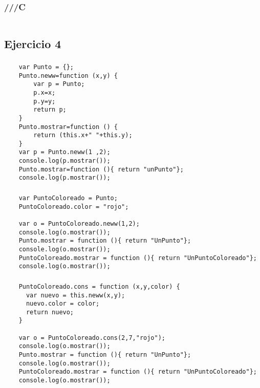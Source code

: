 \documentclass[10pt,a4paper]{article}
\begin{document}
\subsubsection{///C}
    \begin{lstlisting}
    \end{lstlisting}
\subsection{Ejercicio 4}
\subsubsection{}
    \begin{lstlisting}
    var Punto = {};
    Punto.neww=function (x,y) {
    	var p = Punto;
    	p.x=x;
    	p.y=y;
    	return p;
    }
    Punto.mostrar=function () {
    	return (this.x+" "+this.y);
    }
    var p = Punto.neww(1 ,2);
    console.log(p.mostrar());
    Punto.mostrar=function (){ return "unPunto"};
    console.log(p.mostrar());
    \end{lstlisting}

\subsubsection{}
    \begin{lstlisting}
    var PuntoColoreado = Punto;
    PuntoColoreado.color = "rojo";
    
    var o = PuntoColoreado.neww(1,2);
    console.log(o.mostrar());
    Punto.mostrar = function (){ return "UnPunto"};
    console.log(o.mostrar());
    PuntoColoreado.mostrar = function (){ return "UnPuntoColoreado"};
    console.log(o.mostrar());
    \end{lstlisting}
\subsubsection{}
    \begin{lstlisting}
    PuntoColoreado.cons = function (x,y,color) {
      var nuevo = this.neww(x,y);
      nuevo.color = color;
      return nuevo;
    }

    var o = PuntoColoreado.cons(2,7,"rojo");
    console.log(o.mostrar());
    Punto.mostrar = function (){ return "UnPunto"};
    console.log(o.mostrar());
    PuntoColoreado.mostrar = function (){ return "UnPuntoColoreado"};
    console.log(o.mostrar());
    \end{lstlisting}
\end{document}
